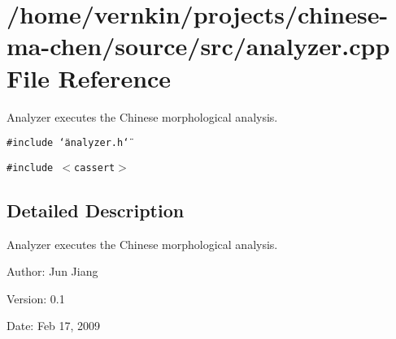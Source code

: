 \section{/home/vernkin/projects/chinese-ma-chen/source/src/analyzer.cpp File Reference}
\label{analyzer_8cpp}
Analyzer executes the Chinese morphological analysis.  


{\tt \#include \char`\"{}analyzer.h\char`\"{}}\par
{\tt \#include $<$cassert$>$}\par


\subsection{Detailed Description}
Analyzer executes the Chinese morphological analysis. 

\begin{Desc}
\item[Author:]Jun Jiang \end{Desc}
\begin{Desc}
\item[Version:]0.1 \end{Desc}
\begin{Desc}
\item[Date:]Feb 17, 2009 \end{Desc}
